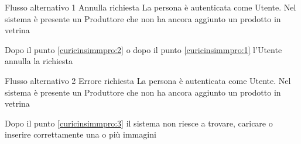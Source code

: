 %
{Flusso alternativo 1}%
{Annulla richiesta}%
{La persona è autenticata come Utente. Nel sistema è presente un Produttore che non ha ancora aggiunto un prodotto in vetrina}%
{\postNulle}%
{\begin{enumCU}
		\item Dopo il punto \ref{curicinsimmpro:2} o dopo il punto \ref{curicinsimmpro:1} l'Utente annulla la richiesta
	\end{enumCU}}%
%
{Flusso alternativo 2}%
{Errore richiesta}%
{La persona è autenticata come Utente. Nel sistema è presente un Produttore che non ha ancora aggiunto un prodotto in vetrina}%
{\postNulle}%
{\begin{enumCU}
		\item Dopo il punto \ref{curicinsimmpro:3} il sistema non riesce a trovare, caricare o inserire correttamente una o più immagini
	\end{enumCU}}%


